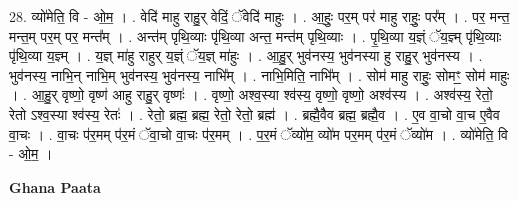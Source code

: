 \documentclass[17pt]{extarticle}
\begin{document}
28. व्यो॑मेति॒ वि - ओ॒म॒ । . वेदि॑ माहु राहु॒र् वेदिं॒ ॅवेदि॑ माहुः । . आ॒हुः॒ पर॒म् पर॑ माहु राहुः॒ पर᳚म् । . पर॒ मन्त॒ मन्त॒म् पर॒म् पर॒ मन्त᳚म् । . अन्त॑म् पृथि॒व्याः पृ॑थि॒व्या अन्त॒ मन्त॑म् पृथि॒व्याः । . पृ॒थि॒व्या य॒ज्ञ्ं ॅय॒ज्ञ्म् पृ॑थि॒व्याः पृ॑थि॒व्या य॒ज्ञ्म् । . य॒ज्ञ् मा॑हु राहुर् य॒ज्ञ्ं ॅय॒ज्ञ् मा॑हुः । . आ॒हु॒र् भुव॑नस्य॒ भुव॑नस्या हु राहु॒र् भुव॑नस्य । . भुव॑नस्य॒ नाभि॒न् नाभि॒म् भुव॑नस्य॒ भुव॑नस्य॒ नाभि᳚म् । . नाभि॒मिति॒ नाभि᳚म् । . सोम॑ माहु राहुः॒ सोमꣳ॒॒ सोम॑ माहुः । . आ॒हु॒र् वृष्णो॒ वृष्ण॑ आहु राहु॒र् वृष्णः॑ । . वृष्णो॒ अश्व॒स्या श्व॑स्य॒ वृष्णो॒ वृष्णो॒ अश्व॑स्य । . अश्व॑स्य॒ रेतो॒ रेतो ऽश्व॒स्या श्व॑स्य॒ रेतः॑ । . रेतो॒ ब्रह्म॒ ब्रह्म॒ रेतो॒ रेतो॒ ब्रह्म॑ । . ब्रह्मै॒वैव ब्रह्म॒ ब्रह्मै॒व । . ए॒व वा॒चो वा॒च ए॒वैव वा॒चः । . वा॒चः प॑र॒मम् प॑र॒मं ॅवा॒चो वा॒चः प॑र॒मम् । . प॒र॒मं ॅव्यो॑म॒ व्यो॑म पर॒मम् प॑र॒मं ॅव्यो॑म । . व्यो॑मेति॒ वि - ओ॒म॒ । \newline

\textbf{Ghana Paata } \newline
\end{document}
